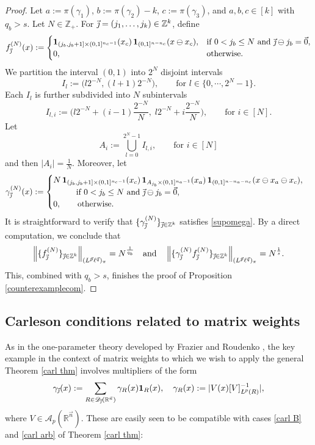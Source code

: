 \documentclass[11pt, reqno]{amsart}
\theoremstyle{definition}
\theoremstyle{remark}
\numberwithin{equation}{section}
\newcommand{\A}{\mathscr A}
\newcommand{\D}{\mathscr D}
\newcommand{\R}{\mathbb R}
\newcommand{\Z}{\mathbb Z}
\newcommand{\vj}{\vec{\textit{\j}}}
\newcommand{\vn}{\vec n}
\newcommand{\vp}{\vec p}
\newcommand{\vq}{\vec q}
\newcommand{\one}{\mathbf{1}}
\newcommand{\aveL}{\textit{\L}}
\newcommand{\abs}[1]{|#1|}
\begin{document}
\begin{proof}
Let $a:=\pi(\gamma_1)$,
$b:=\pi(\gamma_2)-k$,
$c:=\pi(\gamma_3)$,
and $a,b,c\in[k]$ with $q_b>s$.
Let $N\in\mathbb Z_+$. For $\vj=(j_1,\dots,j_k)\in\mathbb Z^k$, define
$$
f^{(N)}_{\vj}(x)
:=
\begin{cases}
\mathbf 1_{(j_b,j_b+1]\times(0,1]^{n_c-1}}(x_c)\,
\mathbf 1_{(0,1]^{n-n_c}}(x\ominus x_c),
&\text{if } 0<j_b\le N \text{ and } \vj\ominus j_b=\vec 0,\\
0,&\text{otherwise}.
\end{cases}
$$
We partition the interval $(0,1)$ into $2^N$ disjoint intervals
$$
I_l := \Big(l2^{-N},(l+1)2^{-N}\Big), \qquad\text{for } l\in\{0,\cdots,2^N-1\}.
$$
Each $I_l$ is further subdivided into $N$ subintervals
$$
I_{l,i}
:=
\Bigg(
l2^{-N}+(i-1)\frac{2^{-N}}{N},
\;
l2^{-N}+i\frac{2^{-N}}{N}
\Bigg),
\qquad\text{for } i\in[N].
$$
Let
$$
A_i := \bigcup_{l=0}^{2^N-1} I_{l,i},
\qquad\text{for } i\in[N]
$$
and then $|A_i|=\frac1N$.
Moreover, let
$$
\gamma^{(N)}_{\vj}(x)
:=
\begin{cases}
N\,
\mathbf 1_{(j_b,j_b+1]\times(0,1]^{n_c-1}}(x_c)\,
\mathbf 1_{A_{j_b}\times(0,1]^{n_a-1}}(x_a)\,
\mathbf 1_{(0,1]^{n-n_a-n_c}}(x\ominus x_a\ominus x_c), \\
\phantom{0,}\qquad \text{if } 0<j_b\le N \text{ and } \vj\ominus j_b=\vec 0,\\
0,\qquad \text{otherwise}.
\end{cases}
$$
It is straightforward to verify that
$\{\gamma^{(N)}_{\vj}\}_{\vj\in\mathbb Z^k}$ satisfies \eqref{supomega}.
By a direct computation, we conclude that
\begin{align*}
\left\|\{f^{(N)}_{\vj}\}_{\vj\in\Z^k}\right\|_{(L^{\vp}\ell^{\vq})_\pi}=N^\frac1{q_{b}}
\quad\text{and}\quad
\left\|\{\gamma_{\vj}^{(N)} f^{(N)}_{\vj}\}_{\vj\in\Z^k}
\right\|_{(L^{\vp}\ell^{\vq})_\pi}=N^{\frac1s}.
\end{align*}
This, combined with $q_b>s$, finishes the proof of Proposition \ref{counterexamplecom}.
\end{proof}

\subsection{Carleson conditions related to matrix weights} \label{Carl special1}

As in the one-parameter theory developed by Frazier and Roudenko \cite[Section 3]{FR21}, the key example in the context of matrix weights to which we wish to apply the general Theorem \ref{carl thm} involves multipliers of the form
\begin{equation}\label{carl main ex}
\gamma_{\vj}(x):=\sum_{R\in\D_{\vj}(\R^{\vn})}\gamma_R(x)\one_R(x),\quad
\gamma_R(x):=\abs{V(x)[V]_{\aveL^p(R)}^{-1}},
\end{equation}
where $V\in\A_p(\R^{\vn})$. These are easily seen to be compatible with cases \eqref{carl B} and \eqref{carl arb} of Theorem \ref{carl thm}:
\end{document}
